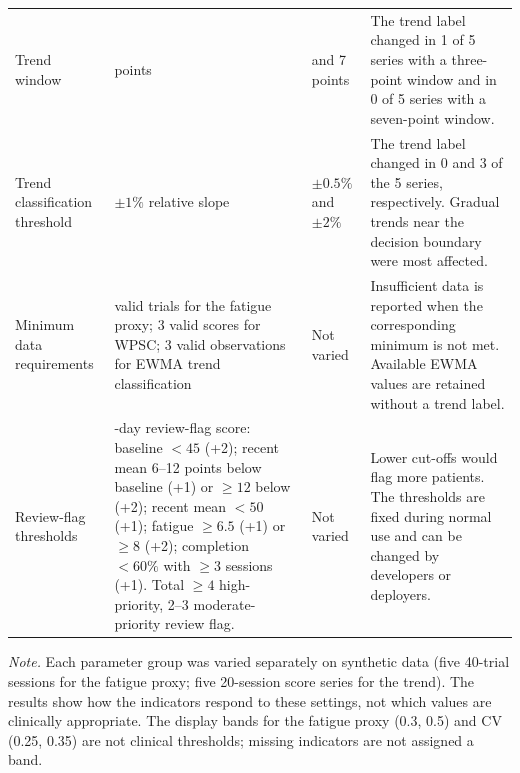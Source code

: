 \documentclass[11pt,a4paper]{article}
\begin{document}
\begin{longtable}{
>{\raggedright\arraybackslash}p{2.8cm}
>{\raggedright\arraybackslash}p{4.3cm}
>{\raggedright\arraybackslash}p{3.1cm}
>{\raggedright\arraybackslash}p{5.6cm}
}
Trend window
& 5 points
& 3 and 7 points
& The trend label changed in 1 of 5 series with a three-point window and in
0 of 5 series with a seven-point window. \\

Trend classification threshold
& $\pm1\%$ relative slope
& $\pm0.5\%$ and $\pm2\%$
& The trend label changed in 0 and 3 of the 5 series, respectively.
Gradual trends near the decision boundary were most affected. \\

Minimum data requirements
& 8 valid trials for the fatigue proxy; 3 valid scores for WPSC; 3 valid
observations for EWMA trend classification
& Not varied
& Insufficient data is reported when the corresponding minimum is not met.
Available EWMA values are retained without a trend label. \\

Review-flag thresholds
& 14-day review-flag score: baseline $<45$ (+2); recent mean 6--12 points below
baseline (+1) or $\geq12$ below (+2); recent mean $<50$ (+1); fatigue
$\geq6.5$ (+1) or $\geq8$ (+2); completion $<60\%$ with $\geq3$ sessions
(+1). Total $\geq4$ high-priority, 2--3 moderate-priority review flag.
& Not varied
& Lower cut-offs would flag more patients. The thresholds are fixed during
normal use and can be changed by developers or deployers. \\

\end{longtable}

\noindent\textit{Note.}
Each parameter group was varied separately on synthetic data (five
40-trial sessions for the fatigue proxy; five 20-session score series for the
trend). The results show how the indicators respond to these settings, not
which values are clinically appropriate. The display bands for the fatigue
proxy (0.3, 0.5) and CV (0.25, 0.35) are not clinical thresholds; missing
indicators are not assigned a band.



\clearpage
\small


\clearpage
\footnotesize
\end{document}
